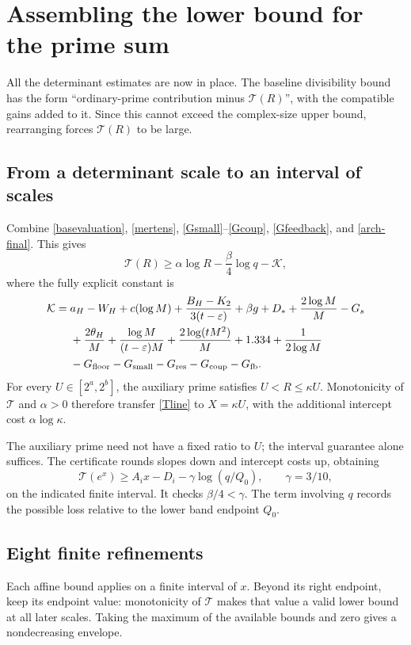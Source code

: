 \documentclass[11pt]{article}
\newcommand{\Tn}{\mathcal T}
\begin{document}
\section{Assembling the lower bound for the prime sum}\label{affine}
All the determinant estimates are now in place. The baseline
divisibility bound has the form ``ordinary-prime contribution minus
\(\Tn(R)\)'', with the compatible gains added to it. Since this
cannot exceed the complex-size upper bound, rearranging forces
\(\Tn(R)\) to be large.

\subsection{From a determinant scale to an interval of scales}
Combine \eqref{basevaluation}, \eqref{mertens},
\eqref{Gsmall}--\eqref{Gcoup}, \eqref{Gfeedback}, and
\eqref{arch-final}. This gives
\begin{equation}\label{Tline}
 \Tn(R)\ge\alpha\log R-\frac\beta4\log q-\mathcal K,
\end{equation}
where the fully explicit constant is
\begin{align*}
 \mathcal K={}&a_H-W_H+c(\log M)
 +\frac{B_H-K_2}{3(t-\varepsilon)}+\beta g+D_*
 +\frac{2\log M}{M}-G_s\\
 &+\frac{2\theta_H}{M}+\frac{\log M}{(t-\varepsilon)M}
 +\frac{2\log(tM^2)}M+1.334+\frac1{2\log M}\\
 &-G_{\rm floor}-G_{\rm small}-G_{\rm res}-G_{\rm coup}-G_{\rm fb}.
\end{align*}
For every \(U\in[2^a,2^b]\), the auxiliary prime satisfies
\(U<R\le\kappa U\). Monotonicity of \(\Tn\) and \(\alpha>0\)
therefore transfer \eqref{Tline} to \(X=\kappa U\), with the
additional intercept cost \(\alpha\log\kappa\).

The auxiliary prime need not have a fixed ratio to \(U\); the interval
guarantee alone suffices. The certificate rounds slopes down and
intercept costs up, obtaining
\[
 \Tn(e^x)\ge A_i x-D_i-\gamma\log(q/Q_0),\qquad
 \gamma=3/10,
\]
on the indicated finite interval. It checks \(\beta/4<\gamma\).
The term involving \(q\) records the possible loss relative to the
lower band endpoint \(Q_0\).

\subsection{Eight finite refinements}
Each affine bound applies on a finite interval of \(x\). Beyond its
right endpoint, keep its endpoint value: monotonicity of \(\Tn\)
makes that value a valid lower bound at all later scales. Taking the
maximum of the available bounds and zero gives a nondecreasing
envelope.
\end{document}
